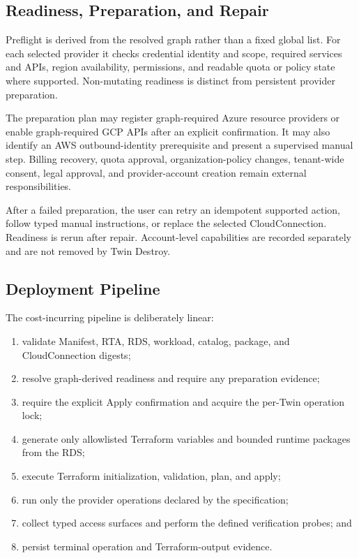 \subsection{Readiness, Preparation, and Repair}
\label{sec:deploy-credential-validation}

Preflight is derived from the resolved graph rather than a fixed global list.
For each selected provider it checks credential identity and scope, required
services and APIs, region availability, permissions, and readable quota or
policy state where supported. Non-mutating readiness is distinct from
persistent provider preparation.

The preparation plan may register graph-required Azure resource providers or
enable graph-required GCP APIs after an explicit confirmation. It may also
identify an AWS outbound-identity prerequisite and present a supervised manual
step. Billing recovery, quota approval, organization-policy changes,
tenant-wide consent, legal approval, and provider-account creation remain
external responsibilities.

After a failed preparation, the user can retry an idempotent supported action,
follow typed manual instructions, or replace the selected CloudConnection.
Readiness is rerun after repair. Account-level capabilities are recorded
separately and are not removed by Twin Destroy.

\subsection{Deployment Pipeline}
\label{sec:deploy-pipeline}

The cost-incurring pipeline is deliberately linear:

\begin{enumerate}
    \item validate Manifest, RTA, RDS, workload, catalog, package, and
    CloudConnection digests;
    \item resolve graph-derived readiness and require any preparation evidence;
    \item require the explicit Apply confirmation and acquire the per-Twin
    operation lock;
    \item generate only allowlisted Terraform variables and bounded runtime
    packages from the RDS;
    \item execute Terraform initialization, validation, plan, and apply;
    \item run only the provider operations declared by the specification;
    \item collect typed access surfaces and perform the defined verification
    probes; and
    \item persist terminal operation and Terraform-output evidence.
\end{enumerate}

